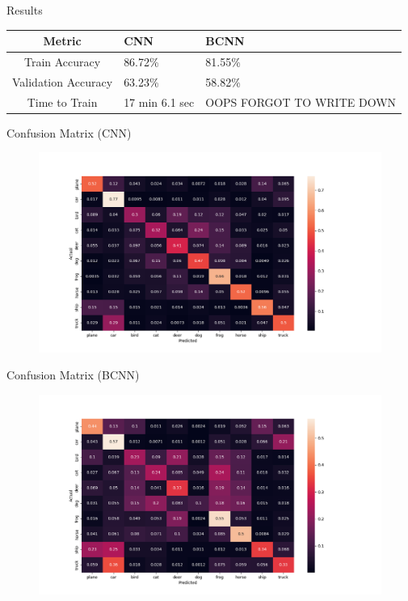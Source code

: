\documentclass{beamer}
\begin{document}
\begin{frame}{Results}
	\centering
	\begin{tabular}{|c||p{3cm}|p{3cm}|} %
		\hline
		\textbf{Metric} & \textbf{CNN} & \textbf{BCNN} \\ [0.5ex] 
		\hline\hline
		Train Accuracy & 86.72\% & 81.55\%\\
		\hline
		Validation Accuracy & 63.23\%  & 58.82\%  \\
		\hline
		Time to Train & 17 min 6.1 sec  & OOPS FORGOT TO WRITE DOWN  \\
		\hline
	\end{tabular}
\end{frame}

\begin{frame}{Confusion Matrix (CNN)}
	\begin{figure}
		\includegraphics[width=.95\textwidth]{../Images/CNN_confusion_matrix.png}
	\end{figure}
\end{frame}

\begin{frame}{Confusion Matrix (BCNN)}
	\begin{figure}
		\includegraphics[width=.95\textwidth]{../Images/BNN_confusion_matrix.png}
	\end{figure}
\end{frame}
\end{document}
